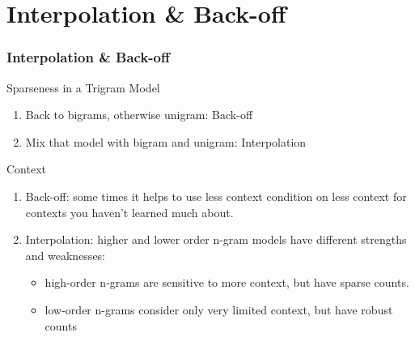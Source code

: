 \documentclass{beamer}
\begin{document}



\section{Interpolation \& Back-off}



\begin{frame}\frametitle{Interpolation \& Back-off}

\begin{block}{Sparseness in a Trigram Model}

\begin{enumerate}
\item Back to bigrams, otherwise unigram: \alert{Back-off}
\item Mix that model with bigram and unigram: \alert{Interpolation} 
\end{enumerate}

\end{block}


\begin{block}{Context}
\begin{enumerate}
\item \alert{Back-off}: 
some times it helps to use less
context condition on less context for contexts
you haven't learned much about.

\item \alert{Interpolation}: 
higher and lower order n-gram models have different strengths and weaknesses:
\begin{itemize}
\item high-order n-grams are sensitive to more context, but have sparse counts.
\item low-order n-grams consider only very limited context, but have robust counts
\end{itemize}
\end{enumerate}

\end{block}


\end{frame}


\end{document}
